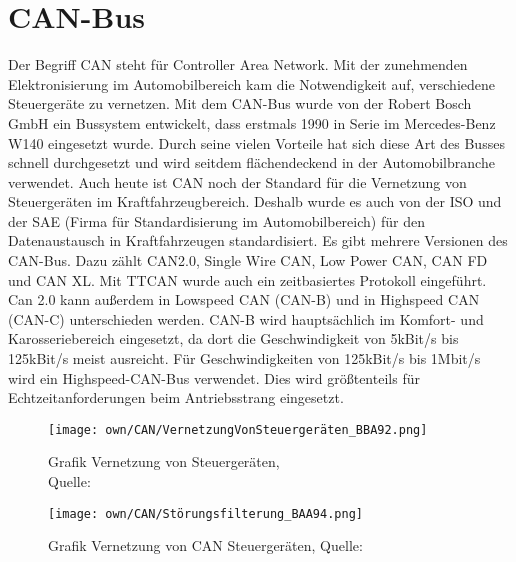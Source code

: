 
\chapter{CAN-Bus}
Der Begriff CAN steht für Controller Area Network.
Mit der zunehmenden Elektronisierung im Automobilbereich kam die Notwendigkeit auf, verschiedene Steuergeräte zu vernetzen.
Mit dem CAN-Bus wurde von der Robert Bosch GmbH ein Bussystem entwickelt, dass erstmals 1990 in Serie im Mercedes-Benz W140 eingesetzt wurde.
Durch seine vielen Vorteile hat sich diese Art des Busses schnell durchgesetzt und wird seitdem flächendeckend in der Automobilbranche verwendet.
Auch heute ist CAN noch der Standard für die Vernetzung von Steuergeräten im Kraftfahrzeugbereich.
Deshalb wurde es auch von der \ac{ISO} und der SAE (Firma für Standardisierung im Automobilbereich) für den Datenaustausch in Kraftfahrzeugen standardisiert.
Es gibt mehrere Versionen des CAN-Bus. Dazu zählt CAN2.0, Single Wire CAN, Low Power CAN, CAN FD und CAN XL.
Mit TTCAN wurde auch ein zeitbasiertes Protokoll eingeführt. 
Can 2.0 kann außerdem in Lowspeed CAN (CAN-B) und in Highspeed CAN (CAN-C) unterschieden werden. 
CAN-B wird hauptsächlich im Komfort- und Karosseriebereich eingesetzt, da dort die Geschwindigkeit von 5kBit/s bis 125kBit/s meist ausreicht. 
Für Geschwindigkeiten von 125kBit/s bis 1Mbit/s wird ein Highspeed-CAN-Bus verwendet.
Dies wird größtenteils für Echtzeitanforderungen beim Antriebsstrang eingesetzt. 


\begin{figure}
    \centering
    \begin{minipage}{.5\textwidth}
      \centering
      \texttt{[image: own/CAN/VernetzungVonSteuergeräten\_BBA92.png]}
    \caption{Grafik Vernetzung von Steuergeräten,\\Quelle: \cite{BAA2011, S.92}}
    \label{fig:VernetzungVonSteuergeraeten}
    \end{minipage}%
    \begin{minipage}{.5\textwidth}
      \centering
      \texttt{[image: own/CAN/Störungsfilterung\_BAA94.png]}
            \caption{Grafik Vernetzung von CAN Steuergeräten, Quelle: \cite{BAA2011, S.94}}
            \label{fig:Stoerungsfilterung}
    \end{minipage}
    \end{figure}


